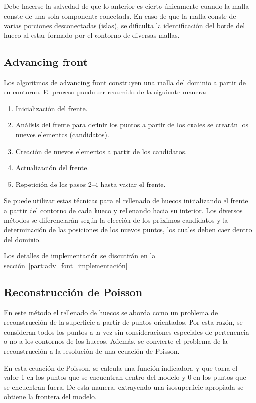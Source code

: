 Debe hacerse la salvedad de que lo anterior es cierto únicamente cuando la malla conste
de una sola componente conectada.
En caso de que la malla conste de varias porciones desconectadas (islas),
se dificulta la identificación del borde del hueco al estar formado por el contorno de diversas mallas.



\subsection{Advancing front}
Los algoritmos de advancing front construyen una malla del dominio a partir de su contorno.
El proceso puede ser resumido de la siguiente manera:
\begin{enumerate}
	\item Inicialización del frente.
	\item Análisis del frente para definir los puntos a partir de los cuales se crearán los nuevos elementos (candidatos).
	\item Creación de nuevos elementos a partir de los candidatos.
	\item Actualización del frente.
	\item Repetición de los pasos 2--4 hasta vaciar el frente.
\end{enumerate}

Se puede utilizar estas técnicas para el rellenado de huecos
inicializando el frente a partir del contorno de cada hueco
y rellenando hacia su interior.
Los diversos métodos se diferenciarán según la elección de los próximos candidatos
y la determinación de las posiciones de los nuevos puntos,
los cuales deben caer dentro del dominio.

Los detalles de implementación se discutirán en la sección~\ref{part:adv_font_implementación}.

\subsection{Reconstrucción de Poisson}
En este método el rellenado de huecos se aborda como un problema de
reconstrucción de la superficie a partir de puntos orientados.  Por esta
razón, se consideran todos los puntos a la vez sin consideraciones
especiales de pertenencia o no a los contornos de los huecos.
Además, se convierte el problema de la reconstrucción a la resolución de
una ecuación de Poisson.

En esta ecuación de Poisson, se calcula una función indicadora $\chi$
que toma el valor 1 en los puntos que se encuentran dentro del modelo
y 0 en los puntos que se encuentran fuera.
De esta manera, extrayendo una isosuperficie apropiada se obtiene la frontera del modelo.

